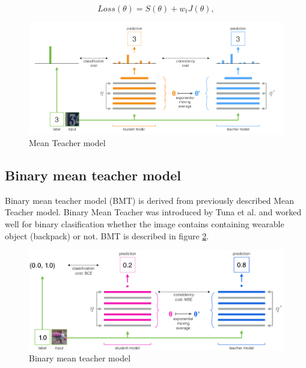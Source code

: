 \begin{equation}
	Loss(\theta) = S(\theta) + w_t J(\theta),
	\label{eq:mt-loss-sum}
\end{equation} 



\begin{figure}[h!]
    \centering
    \includegraphics[width=1\textwidth]{figs/mt.png}
    \caption{Mean Teacher model}
    \label{mtm}
\end{figure}


\subsection{Binary mean teacher model}
\label{bmt}
Binary mean teacher model (BMT) is derived from previously described Mean Teacher model. Binary Mean Teacher was introduced by Tuna et al.\cite{tuna-bmt} and worked well for binary clasification whether the image contains containing wearable object (backpack) or not. BMT is described in figure \ref{fig:bmt}.

\begin{figure}[ht]
    \centering
    \includegraphics[width=1\textwidth]{figs/bmt.png}
    \caption{Binary mean teacher model}
    \label{fig:bmt}
\end{figure}


